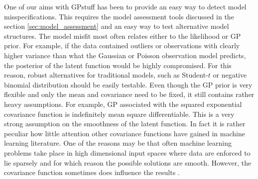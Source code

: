 \documentclass[twoside,11pt]{article}
\newcommand{\pkg}[1]{{\fontseries{b}\selectfont #1}}
\begin{document}
One of our aims with \pkg{GPstuff} has been to provide an easy way to
detect model misspecifications. This requires the model assessment
tools discussed in the section \ref{sec:model_assessment} and an easy
way to test alternative model structures. The model misfit most often
relates either to the likelihood or GP prior. For example, if the data
contained outliers or observations with clearly higher variance than
what the Gaussian or Poisson observation model predicts, the posterior
of the latent function would be highly compromised. For this reason,
robust alternatives for traditional models, such as Student-$t$ or
negative binomial distribution should be easily testable. Even though
the GP prior is very flexible and only the mean and covariance need to
be fixed, it still contains rather heavy assumptions. For example, GP
associated with the squared exponential covariance function is
indefinitely mean square differentiable. This is a very strong
assumption on the smoothness of the latent function.  In fact it is
rather peculiar how little attention other covariance functions have
gained in machine learning literature. One of the reasons may be that
often machine learning problems take place in high dimensional input
spaces where data are enforced to lie sparsely and for which reason
the possible solutions are smooth. However, the covariance function
sometimes does influence the results \citep[see
e.g.][]{Vanhatalo+Vehtari:2008,Vanhatalo+Pietilainen+Vehtari:2010}.
\end{document}

